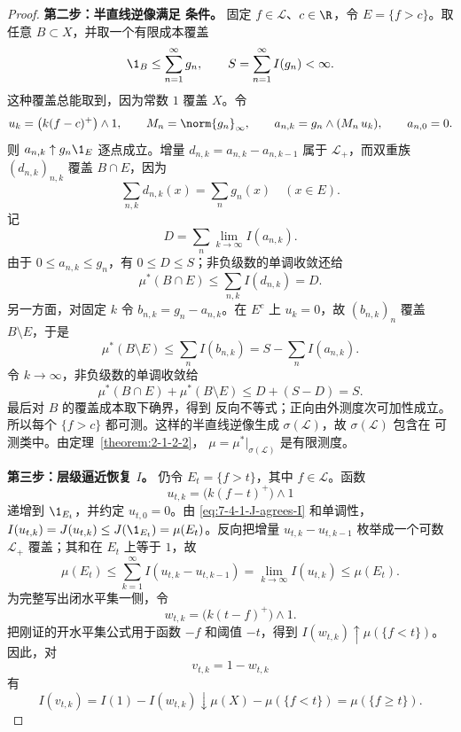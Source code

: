 \begin{proof}
\textbf{第二步：半直线逆像满足 \Caratheodory{} 条件。}
固定 $f\in\mathcal L$、$c\in\R$，令 $E=\{f>c\}$。取任意 $B\subset X$，并取一个有限成本覆盖
\[
 \1_B\le\sum_{n=1}^\infty g_n,\qquad
 S=\sum_{n=1}^\infty I(g_n)<\infty.
\]
这种覆盖总能取到，因为常数 $1$ 覆盖 $X$。令
\[
 u_k=\bigl(k(f-c)^+\bigr)\wedge1,\qquad
 M_n=\norm{g_n}_\infty,\qquad
 a_{n,k}=g_n\wedge(M_n\,u_k),\qquad a_{n,0}=0.
\]
则 $a_{n,k}\uparrow g_n\1_E$ 逐点成立。增量
$d_{n,k}=a_{n,k}-a_{n,k-1}$ 属于 $\mathcal L_+$，而双重族 $(d_{n,k})_{n,k}$ 覆盖 $B\cap E$，因为
\[
 \sum_{n,k}d_{n,k}(x)=\sum_ng_n(x)\quad(x\in E).
\]
记
\[
 D=\sum_n\lim_{k\to\infty}I(a_{n,k}).
\]
由于 $0\le a_{n,k}\le g_n$，有 $0\le D\le S$；非负级数的单调收敛还给
\[
 \mu^*(B\cap E)\le\sum_{n,k}I(d_{n,k})=D.
\]
另一方面，对固定 $k$ 令 $b_{n,k}=g_n-a_{n,k}$。在 $E^c$ 上 $u_k=0$，故 $(b_{n,k})_n$ 覆盖
$B\setminus E$，于是
\[
 \mu^*(B\setminus E)
 \le\sum_nI(b_{n,k})
 =S-\sum_nI(a_{n,k}).
\]
令 $k\to\infty$，非负级数的单调收敛给
\[
 \mu^*(B\cap E)+\mu^*(B\setminus E)\le D+(S-D)=S.
\]
最后对 $B$ 的覆盖成本取下确界，得到 \Caratheodory{} 反向不等式；正向由外测度次可加性成立。
所以每个 $\{f>c\}$ 都可测。这样的半直线逆像生成 $\sigma(\mathcal L)$，故
$\sigma(\mathcal L)$ 包含在 \Caratheodory{} 可测类中。由定理~\ref{theorem:2-1-2-2}，
$\mu=\mu^*|_{\sigma(\mathcal L)}$ 是有限测度。

\textbf{第三步：层级逼近恢复 $I$。}
仍令 $E_t=\{f>t\}$，其中 $f\in\mathcal L$。函数
\[
 u_{t,k}=\bigl(k(f-t)^+\bigr)\wedge1
\]
递增到 $\1_{E_t}$，并约定 $u_{t,0}=0$。由 \eqref{eq:7-4-1-J-agrees-I} 和单调性，
$I(u_{t,k})=J(u_{t,k})\le J(\1_{E_t})=\mu(E_t)$。反向把增量
$u_{t,k}-u_{t,k-1}$ 枚举成一个可数 $\mathcal L_+$ 覆盖；其和在 $E_t$ 上等于 $1$，故
\begin{equation}\label{eq:7-4-1-level-functional}
 \mu(E_t)\le\sum_{k=1}^\infty I(u_{t,k}-u_{t,k-1})
 =\lim_{k\to\infty}I(u_{t,k})\le\mu(E_t).
\end{equation}
为完整写出闭水平集一侧，令
\[
 w_{t,k}=\bigl(k(t-f)^+\bigr)\wedge1.
\]
把刚证的开水平集公式用于函数 $-f$ 和阈值 $-t$，得到
$I(w_{t,k})\uparrow\mu(\{f<t\})$。因此，对
\[
 v_{t,k}=1-w_{t,k}
\]
有
\begin{equation}\label{eq:7-4-1-closed-level-functional}
 I(v_{t,k})
 =I(1)-I(w_{t,k})
 \downarrow\mu(X)-\mu(\{f<t\})
 =\mu(\{f\ge t\}).
\end{equation}


\end{proof}
